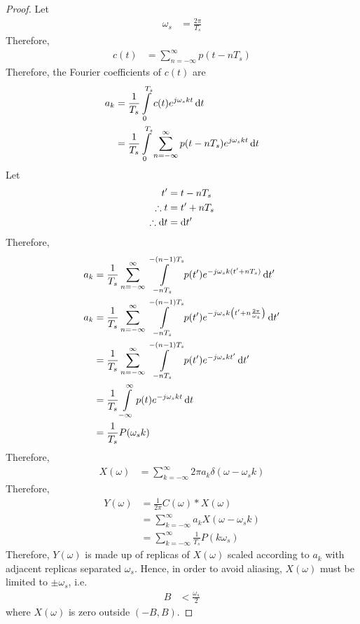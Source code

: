 \documentclass[titlepage, fleqn, a4paper, 12pt, twoside]{article}
\theoremstyle{definition}
\theoremstyle{theorem}
\begin{document}
\begin{proof}
	Let
	\begin{align*}
		\omega_s &= \frac{2 \pi}{T_s}
	\end{align*}
	Therefore,
	\begin{align*}
		c(t) &= \sum\limits_{n = -\infty}^{\infty} p(t - n T_s)
	\end{align*}
	Therefore, the Fourier coefficients of $c(t)$ are
	\begin{align*}
		a_k &= \frac{1}{T_s} \int\limits_{0}^{T_s} c(t) e^{j \omega_s k t} \dif t\\
		&= \frac{1}{T_s} \int\limits_{0}^{T_s} \sum\limits_{n = -\infty}^{\infty} p(t - n T_s) e^{j \omega_s k t} \dif t
	\end{align*}
	Let
	\begin{align*}
		t' &= t - n T_s\\
		\therefore t &= t' + n T_s\\
		\therefore \dif t &= \dif t'
	\end{align*}
	Therefore,
	\begin{align*}
		a_k &= \frac{1}{T_s} \sum\limits_{n = -\infty}^{\infty} \int\limits_{-n T_s}^{-(n - 1) T_s} p(t') e^{-j \omega_s k (t' + n T_s)} \dif t'\\
		a_k &= \frac{1}{T_s} \sum\limits_{n = -\infty}^{\infty} \int\limits_{-n T_s}^{-(n - 1) T_s} p(t') e^{-j \omega_s k \left( t' + n \frac{2 \pi}{\omega_s} \right)} \dif t'\\
		&= \frac{1}{T_s} \sum\limits_{n = -\infty}^{\infty} \int\limits_{-n T_s}^{-(n - 1) T_s} p(t') e^{-j \omega_s k t'} \dif t'\\
		&= \frac{1}{T_s} \int\limits_{-\infty}^{\infty} p(t) e^{-j \omega_s k t} \dif t\\
		&= \frac{1}{T_s} P(\omega_s k)
	\end{align*}
	Therefore,
	\begin{align*}
		X(\omega) &= \sum\limits_{k = -\infty}^{\infty} 2 \pi a_k \delta(\omega - \omega_s k)
	\end{align*}
	Therefore,
	\begin{align*}
		Y(\omega) &= \frac{1}{2 \pi} C(\omega) \ast X(\omega)\\
		&= \sum\limits_{k = -\infty}^{\infty} a_k X(\omega - \omega_s k)\\
		&= \sum\limits_{k = -\infty}^{\infty} \frac{1}{T_s} P(k \omega_s)
	\end{align*}
	Therefore, $Y(\omega)$ is made up of replicas of $X(\omega)$ scaled according to $a_k$ with adjacent replicas separated $\omega_s$.
	Hence, in order to avoid aliasing, $X(\omega)$ must be limited to $\pm \omega_s$, i.e.
	\begin{align*}
		B &< \frac{\omega_s}{2}
	\end{align*}
	where $X(\omega)$ is zero outside $(-B,B)$.
\end{proof}
\end{document}
